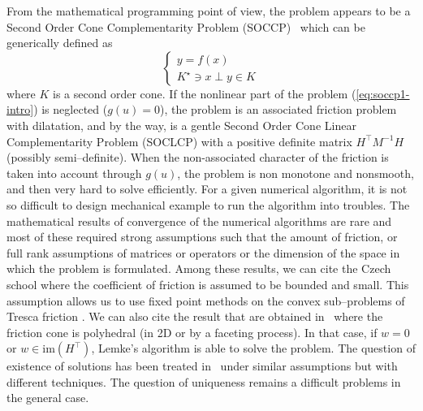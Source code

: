 From the mathematical programming point of view, the problem appears to be a Second Order Cone Complementarity Problem (SOCCP)~\cite{Facchinei.Pang2003} which can be generically defined as
\begin{equation}
  \begin{cases}
    y =f(x) \\
    K^\star \ni x \perp y \in K
  \end{cases}
\end{equation}
where $K$ is a second order cone. If the nonlinear part of the problem (\ref{eq:soccp1-intro}) is neglected ($g(u)=0$), the problem is an associated friction problem with dilatation, and by the way, is a gentle Second Order Cone Linear Complementarity Problem (SOCLCP) with a positive definite matrix $H^\top M^{-1} H$ (possibly semi--definite).
When the non-associated character of the friction is taken into account through $g(u)$, the problem is non monotone and nonsmooth, and then very hard to solve efficiently. For a given numerical algorithm, it is not so difficult to design mechanical example to run the algorithm into troubles. The mathematical results of convergence of the numerical algorithms are rare and most of these required strong assumptions such that  the amount of friction, or full rank assumptions of matrices or operators or the dimension of the space in which the problem is formulated. Among these results, we can cite the Czech school where the coefficient of friction is assumed to be bounded and small. This assumption allows us to use fixed point methods on the convex sub--problems of Tresca friction . We can also cite the result that are obtained in~\cite{Pang.Trinkle1996,Stewart.Trinkle1996,Anitescu.Potra97} where the friction cone is polyhedral (in 2D or by a faceting process). In that case, if $w=0$ or $w \in \mathrm{im}(H^\top)$, Lemke's algorithm is able to solve the problem. The question of existence of solutions has been treated in~\cite{Klarbring.Pang1998,Acary.ea_ZAMM2011} under similar assumptions but with different techniques. The question of uniqueness remains a difficult problems in the general case.


